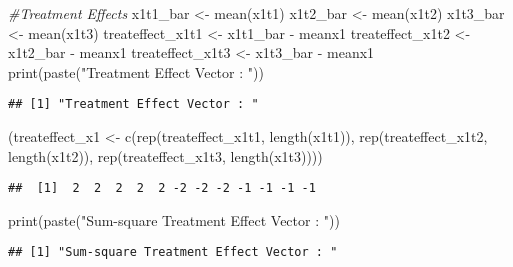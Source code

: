 \documentclass[
]{article}
\newenvironment{Shaded}{\begin{snugshade}}{\end{snugshade}}
\newcommand{\CommentTok}[1]{\textcolor[rgb]{0.56,0.35,0.01}{\textit{#1}}}
\newcommand{\FunctionTok}[1]{\textcolor[rgb]{0.00,0.00,0.00}{#1}}
\newcommand{\NormalTok}[1]{#1}
\newcommand{\OtherTok}[1]{\textcolor[rgb]{0.56,0.35,0.01}{#1}}
\newcommand{\SpecialCharTok}[1]{\textcolor[rgb]{0.00,0.00,0.00}{#1}}
\newcommand{\StringTok}[1]{\textcolor[rgb]{0.31,0.60,0.02}{#1}}
\begin{document}
\begin{Shaded}
\begin{Highlighting}[]
\CommentTok{\#Treatment Effects}
\NormalTok{x1t1\_bar }\OtherTok{\textless{}{-}} \FunctionTok{mean}\NormalTok{(x1t1)}
\NormalTok{x1t2\_bar }\OtherTok{\textless{}{-}} \FunctionTok{mean}\NormalTok{(x1t2)}
\NormalTok{x1t3\_bar }\OtherTok{\textless{}{-}} \FunctionTok{mean}\NormalTok{(x1t3)}
\NormalTok{treateffect\_x1t1 }\OtherTok{\textless{}{-}}\NormalTok{ x1t1\_bar }\SpecialCharTok{{-}}\NormalTok{ meanx1}
\NormalTok{treateffect\_x1t2 }\OtherTok{\textless{}{-}}\NormalTok{ x1t2\_bar }\SpecialCharTok{{-}}\NormalTok{ meanx1}
\NormalTok{treateffect\_x1t3 }\OtherTok{\textless{}{-}}\NormalTok{ x1t3\_bar }\SpecialCharTok{{-}}\NormalTok{ meanx1}
\FunctionTok{print}\NormalTok{(}\FunctionTok{paste}\NormalTok{(}\StringTok{"Treatment Effect Vector : "}\NormalTok{))}
\end{Highlighting}
\end{Shaded}

\begin{verbatim}
## [1] "Treatment Effect Vector : "
\end{verbatim}

\begin{Shaded}
\begin{Highlighting}[]
\NormalTok{(treateffect\_x1 }\OtherTok{\textless{}{-}} \FunctionTok{c}\NormalTok{(}\FunctionTok{rep}\NormalTok{(treateffect\_x1t1, }\FunctionTok{length}\NormalTok{(x1t1)), }
                     \FunctionTok{rep}\NormalTok{(treateffect\_x1t2, }\FunctionTok{length}\NormalTok{(x1t2)), }
                     \FunctionTok{rep}\NormalTok{(treateffect\_x1t3, }\FunctionTok{length}\NormalTok{(x1t3))))}
\end{Highlighting}
\end{Shaded}

\begin{verbatim}
##  [1]  2  2  2  2  2 -2 -2 -2 -1 -1 -1 -1
\end{verbatim}

\begin{Shaded}
\begin{Highlighting}[]
\FunctionTok{print}\NormalTok{(}\FunctionTok{paste}\NormalTok{(}\StringTok{"Sum{-}square Treatment Effect Vector : "}\NormalTok{))}
\end{Highlighting}
\end{Shaded}

\begin{verbatim}
## [1] "Sum-square Treatment Effect Vector : "
\end{verbatim}
\end{document}
